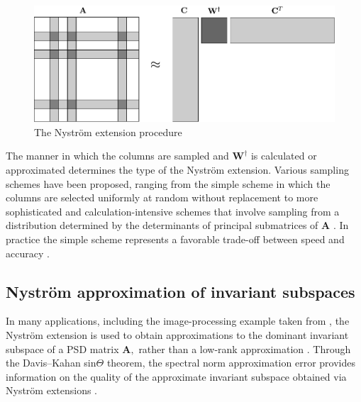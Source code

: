\documentclass[11pt,letterpaper,twoside,reqno,nosumlimits]{amsart}
\newcommand{\mat}[1]{\ensuremath{\bm{#1}}}
\theoremstyle{remark}
\begin{document}
\begin{figure}[h]
 \centering
 \includegraphics[scale=.75]{nystrom-procedure.pdf}
 \caption{The Nystr\"om extension procedure}
 \label{fig:nystromprocedure}
\end{figure}

The manner in which the columns are sampled and $\mat{W}^\dagger$ is calculated or approximated determines the type of the Nystr\"om extension. Various sampling schemes have been proposed, ranging from the simple scheme in which the columns are selected uniformly at random without replacement to more sophisticated and calculation-intensive schemes that involve sampling from a distribution determined by the determinants of principal submatrices of $\mat{A}$ \cite{BW09}. In practice the simple scheme represents a favorable trade-off between speed and accuracy \cite{KMT09}.
 
\subsection{Nystr\"om approximation of invariant subspaces}
In many applications, including the image-processing example taken from \cite{BCFM04}, the Nystr\"om extension is used to obtain approximations to the dominant invariant subspace of a PSD matrix $\mat{A},$ rather than a low-rank approximation \cite{homrighausen11}. 
Through the Davis--Kahan sin$\Theta$ theorem, the spectral norm approximation error provides information on the quality of the approximate invariant subspace obtained via Nystr\"om extensions \cite[Section VII.3]{Bhatia97}. 
\end{document}
